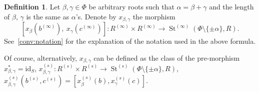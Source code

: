 \documentclass{article}
\theoremstyle{definition}
\newtheorem{df}[lemma]{Definition} \Crefname{df}{Definition}{Definitions}
\theoremstyle{remark}
\DeclareMathOperator\St{St}
\begin{document}
\begin{df}
Let $\beta, \gamma \in \Phi$ be arbitrary roots such that $\alpha = \beta+\gamma$ and the length of $\beta$, $\gamma$ is the same as $\alpha$'s. 
Denote by $x_{\beta,\gamma}$ the morphism
 \[[x_\beta(b^{(\infty)}),\ x_\gamma(c^{(\infty)})]\colon R^{(\infty)} \times R^{(\infty)} \to \St^{(\infty)}(\Phi \setminus\{\pm\alpha\}, R).\]
See~\cref{conv:notation} for the explanation of the notation used in the above formula.

Of course, alternatively, $x_{\beta,\gamma}$ can be defined as the class of the pre-morphism $x_{\beta,\gamma}^* = \mathrm{id}_S$, $x_{\beta,\gamma}^{(s)} \colon R^{(s)}\times R^{(s)} \to \St^{(s)}(\Phi\setminus\{\pm\alpha\}, R)$, $x_{\beta,\gamma}^{(s)}(b^{(s)}, c^{(s)}) = [x_\beta^{(s)}(b), x_\gamma^{(s)}(c)].$
\end{df}
\end{document}
